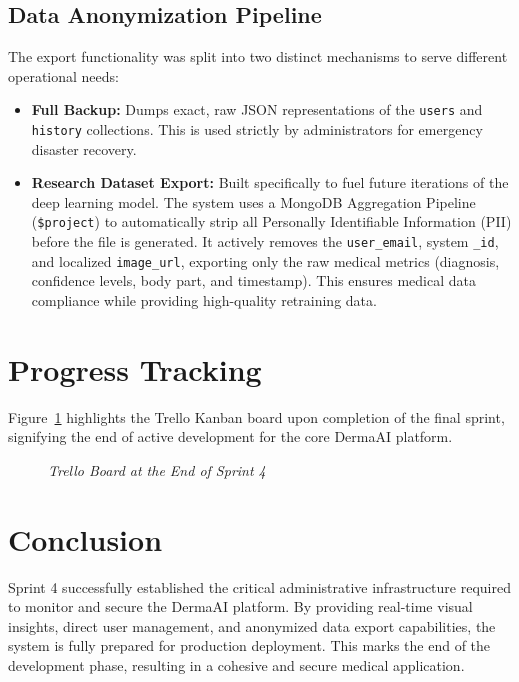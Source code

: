 \subsection{Data Anonymization Pipeline}
The export functionality was split into two distinct mechanisms to serve different operational needs:
\begin{itemize}
	\item \textbf{Full Backup:} Dumps exact, raw JSON representations of the \texttt{users} and \texttt{history} collections. This is used strictly by administrators for emergency disaster recovery.
	\item \textbf{Research Dataset Export:} Built specifically to fuel future iterations of the deep learning model. The system uses a MongoDB Aggregation Pipeline (\texttt{\$project}) to automatically strip all Personally Identifiable Information (PII) before the file is generated. It actively removes the \texttt{user\_email}, system \texttt{\_id}, and localized \texttt{image\_url}, exporting only the raw medical metrics (diagnosis, confidence levels, body part, and timestamp). This ensures medical data compliance while providing high-quality retraining data.
\end{itemize}

\section{Progress Tracking}
Figure~\ref{fig:trello_sprint4} highlights the Trello Kanban board upon completion of the final sprint, signifying the end of active development for the core DermaAI platform.

\begin{figure}[H]
	\centering
	\caption{\textit{Trello Board at the End of Sprint 4}}
	\label{fig:trello_sprint4}
\end{figure}

\section{Conclusion}
Sprint 4 successfully established the critical administrative infrastructure required to monitor and secure the DermaAI platform. By providing real-time visual insights, direct user management, and anonymized data export capabilities, the system is fully prepared for production deployment. This marks the end of the development phase, resulting in a cohesive and secure medical application.
